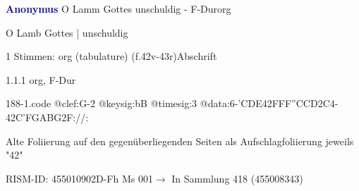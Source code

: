 \documentclass[twocolumn, 12pt]{book}
\begin{document}
\par \vspace{16pt} \textcolor{darkblue}{\textbf{Anonymus  }}\hfillplus{\textbf{[188]}}\newline O Lamm Gottes unschuldig - F-Dur\newline org
\par \begin{itshape}[f.42v, at left:] O Lamb Gottes | unschuldig\end{itshape} 
\par \textcolor{darkblue}{}  1 Stimmen: org (tabulature)  (f.42v-43r)\newline Abschrift
\par 1.1.1  org, F-Dur  
\begin{filecontents*}{188-1.code}
@clef:G-2
@keysig:bB
@timesig:3
@data:6-{'CDE}42FFF''CCD2C4-42C'FGABG2F://:
\end{filecontents*}
\newline %
\par Alte Foliierung auf den gegenüberliegenden Seiten als Aufschlagfoliierung jeweils "42"
\par RISM-ID: 455010902\newline D-Fh  Ms 001\newline $\rightarrow$ In Sammlung 418 (455008343)
      
\end{document}
